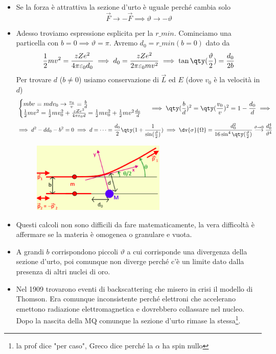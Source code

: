    \begin{itemize}
    \item Se la forza è attrattiva la sezione d'urto è uguale perché cambia solo
        \begin{equation*}
    \vec F\to -\vec F\implies\vartheta\to-\vartheta
    \end{equation*}
    \item Adesso troviamo espressione esplicita per la $r\_{min}$. Cominciamo una particella con $b=0\implies \vartheta=\pi$. Avremo $d_0=r\_{min}(b=0)$ dato da
    \begin{equation*}
    \frac12mv^2=\frac{zZe^2}{4\pi\varepsilon_0d_0}\implies d_0=\frac{zZe^2}{2\pi\varepsilon_0mv^2}\implies \tan\qty(\frac\vartheta2)=\frac{d_0}{2b}
    \end{equation*}
    Per trovare $d$ ($b\neq0$) usiamo conservazione di $\vec L$ ed $E$ (dove $v_0$ è la velocità in $d$)
    \begin{equation*}
        \begin{cases}
        mbv=mdv_0\to \frac{v_0}v=\frac bd\\
        \frac12mv^2=\frac12mv_0^2+\frac{zZe^2}{4\pi\varepsilon_0d}=\frac12mv_0^2+\frac12mv^2\frac{d_0}d
        \end{cases}\implies\qty(\frac bd)^2=\qty(\frac{v_0}v)^2=1-\frac{d_0}d\implies 
    \end{equation*}
    \begin{equation*}
        \implies d^2-dd_0-b^2=0\implies d=\dots=\frac{d_0}2\qty(1+\frac1{\sin(\frac\vartheta2)})\implies \dv{\sigma}{\Omega}= \frac{d_0^2}{16\sin^4\qty(\frac\vartheta2)}\overset{\vartheta\to0}{\longrightarrow}\frac{d_0^4}{\vartheta^4}
    \end{equation*}
    \begin{figure}[H]
        \centering
        \includegraphics[width=0.6\textwidth]{immagini/fig_ruth_b_nullo.png}
    \end{figure}
    \item Questi calcoli non sono difficili da fare matematicamente, la vera difficoltà è affermare se la materia è omogenea o granulare e vuota.
    \item A grandi $b$ corrispondono piccoli $\vartheta$ a cui corrisponde una divergenza della sezione d'urto, poi comunque non diverge perché c'è un limite dato dalla presenza di altri nuclei di oro. 
    \item Nel 1909 trovarono eventi di backscattering che misero in crisi il modello di Thomson. Era comunque inconsistente perché elettroni che accelerano emettono radiazione elettromagnetica e dovrebbero collassare nel nucleo. Dopo la nascita della MQ comunque la sezione d'urto rimase la stessa\footnote{la prof dice "per caso", Greco dice perché la $\alpha$ ha spin nullo}.
\end{itemize}
